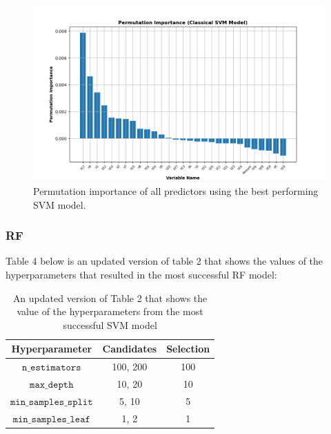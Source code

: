 \documentclass[11pt, oneside]{article}   	%
\begin{document}
\begin{figure}[h!]
    \centering
    \includegraphics[width=1\textwidth]{figures/fig_9.png}
    \captionsetup{font=small} 
    \caption{Permutation importance of all predictors using the best performing SVM model.}
    \label{fig9}
\end{figure}




\subsubsection{RF}

Table 4 below is an updated version of table 2 that shows the values of the hyperparameters that resulted in the most successful RF model:

\begin{table}[h!]
    \centering
    \begin{tabular}{|c|c|c|}
        \hline
        \textbf{Hyperparameter} & \textbf{Candidates} & \textbf{Selection}\\ \hline
        $\texttt{n\_estimators}$ &  100, 200 & 100 \\ \hline
        $\texttt{max\_depth}$ & 10, 20 & 10\\ \hline
        $\texttt{min\_samples\_split}$ & 5, 10 & 5\\ \hline
        $\texttt{min\_samples\_leaf}$ & 1, 2 & 1 \\ \hline
    \end{tabular}
    \caption{An updated version of Table 2 that shows the value of the hyperparameters from the most successful SVM model}
    \label{tab4}
\end{table}
\end{document}
